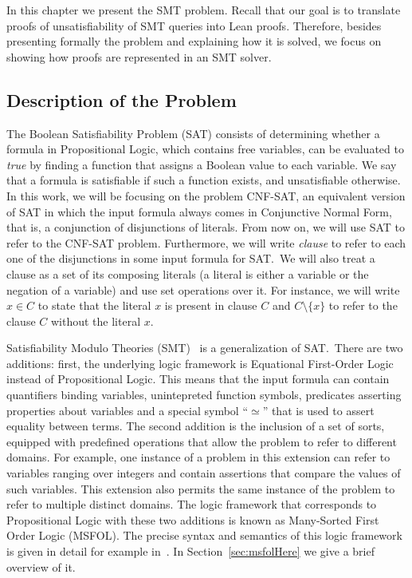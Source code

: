 In this chapter we present the SMT problem. Recall that our goal is to translate proofs of unsatisfiability of SMT queries into Lean proofs. Therefore, besides presenting formally the problem and explaining how it is solved, we focus on showing how proofs are represented in an SMT solver.

\subsection{Description of the Problem}

The Boolean Satisfiability Problem (SAT) consists of determining whether a formula in Propositional Logic, which contains free variables, can be evaluated to \textit{true} by finding a function that assigns a Boolean value to each variable.
We say that a formula is satisfiable if such a function exists, and unsatisfiable otherwise. In
this work, we will be focusing on the problem CNF-SAT, an equivalent version of SAT in
which the input formula always comes in Conjunctive Normal Form, that is, a conjunction
of disjunctions of literals. From now on, we will use SAT to refer to the CNF-SAT problem. Furthermore, we will write \textit{clause} to refer to each one of the disjunctions in some
input formula for SAT.\ We will also treat a clause as a set of its composing literals (a literal is either a variable or the negation of a variable) and use set operations over it. For instance, we will write $x \in C$ to state that the literal $x$ is present in clause $C$ and $C \setminus \{x\}$ to refer to the clause $C$ without the literal $x$.


Satisfiability Modulo Theories (SMT)~\cite[ch. 33]{handbook} is a generalization of SAT.\
There are two additions: first, the underlying logic framework is Equational First-Order
Logic instead of Propositional Logic. This means that the input formula
can contain quantifiers binding variables, unintepreted function symbols,
predicates asserting properties about variables and a special symbol ``$\simeq$'' that is used to assert equality between terms.
The second addition is the inclusion of a set of sorts, equipped with predefined
operations that allow the problem to refer to different domains.
For example, one instance of a problem in this extension can refer to variables
ranging over integers and contain assertions that compare the values of such variables.
This extension also permits the same instance of the problem to refer to multiple
distinct domains.
The logic framework that corresponds to Propositional Logic with these two additions is
known as Many-Sorted First Order Logic (MSFOL). The precise syntax and semantics of this
logic framework is given in detail for example in~\cite{many_sorted}. In
Section~\ref{sec:msfolHere} we give a brief overview of it.

